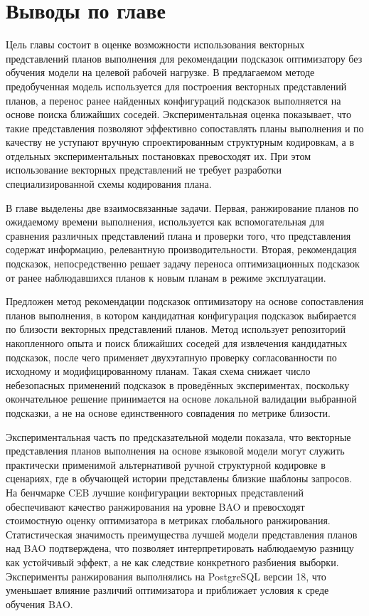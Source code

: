 \section{Выводы по главе}

Цель главы состоит в оценке возможности использования векторных представлений планов выполнения для рекомендации подсказок оптимизатору без обучения модели на целевой рабочей нагрузке. В предлагаемом методе предобученная модель используется для построения векторных представлений планов, а перенос ранее найденных конфигураций подсказок выполняется на основе поиска ближайших соседей. Экспериментальная оценка показывает, что такие представления позволяют эффективно сопоставлять планы выполнения и по качеству не уступают вручную спроектированным структурным кодировкам, а в отдельных экспериментальных постановках превосходят их. При этом использование векторных представлений не требует разработки специализированной схемы кодирования плана.

В главе выделены две взаимосвязанные задачи. Первая, ранжирование планов по ожидаемому времени выполнения, используется как вспомогательная для сравнения различных представлений плана и проверки того, что представления содержат информацию, релевантную производительности. Вторая, рекомендация подсказок, непосредственно решает задачу переноса оптимизационных подсказок от ранее наблюдавшихся планов к новым планам в режиме эксплуатации.

Предложен метод рекомендации подсказок оптимизатору на основе сопоставления планов выполнения, в котором кандидатная конфигурация подсказок выбирается по близости векторных представлений планов. Метод использует репозиторий накопленного опыта и поиск ближайших соседей для извлечения кандидатных подсказок, после чего применяет двухэтапную проверку согласованности по исходному и модифицированному планам. Такая схема снижает число небезопасных применений подсказок в проведённых экспериментах, поскольку окончательное решение принимается на основе локальной валидации выбранной подсказки, а не на основе единственного совпадения по метрике близости.

Экспериментальная часть по предсказательной модели показала, что векторные представления планов  выполнения на основе языковой модели могут служить практически применимой альтернативой ручной структурной кодировке в сценариях, где в обучающей истории представлены близкие шаблоны запросов. На бенчмарке CEB лучшие конфигурации векторных представлений обеспечивают качество ранжирования на уровне BAO и превосходят стоимостную оценку оптимизатора в метриках глобального ранжирования. Статистическая значимость преимущества лучшей модели представления планов над BAO подтверждена, что позволяет интерпретировать наблюдаемую разницу как устойчивый эффект, а не как следствие конкретного разбиения выборки. Эксперименты ранжирования выполнялись на PostgreSQL версии 18, что уменьшает влияние различий оптимизатора и приближает условия к среде обучения BAO.

